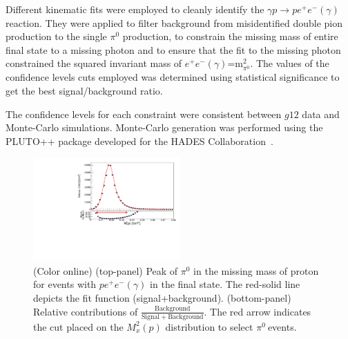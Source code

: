 \documentclass[aps,prc,twocolumn,floatfix,showpacs,preprintnumbers,amsmath,amssymb,superscriptaddress,linenumbers]{revtex4-1}
\def\pizT{$\pi^{0} \ $}
\begin{document}
Different kinematic fits were employed to cleanly identify the 
$\gamma p\rightarrow pe^+e^-(\gamma)$ reaction. They were applied 
to filter background from misidentified double pion production to 
the single $\pi^0$ production, to constrain the missing mass of entire 
final state to a missing photon and to ensure that the fit to the missing 
photon constrained the squared invariant 
mass of $e^+e^-(\gamma)$=m$^2_{\pi^0}$. The values of the confidence levels cuts employed was 
determined using statistical significance to get the best signal/background ratio.

 The confidence levels for each constraint were consistent 
between $g12$ data and Monte-Carlo simulations. 
Monte-Carlo generation was performed using the PLUTO++ package 
developed for the HADES Collaboration~\cite{PLUTO}.
\begin{figure}[htb!]
\centerline{
        \includegraphics[height=0.35\textwidth,width=0.5\textwidth]{G12_Pi0_wBck.pdf}}

        \caption {(Color online) (top-panel) Peak of $\pi^0$ in the missing
        mass of proton for events with $pe^+e^-(\gamma)$ in the final state.
        The red-solid line depicts the fit function (signal+background).
        (bottom-panel) Relative contributions of $\frac{\mathrm{Background}}
        {\mathrm{Signal + Background}}$. The red arrow indicates the cut
        placed on the $M_x^2(p)$ distribution to select \pizT events.}
        \label{fig:pi0_peak}
\end{figure}
\end{document}
